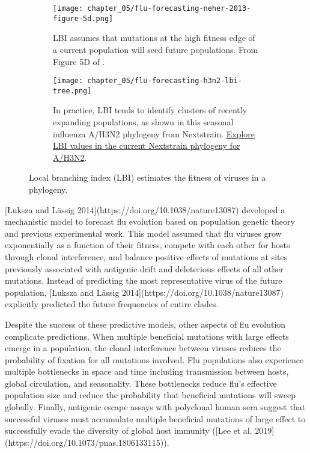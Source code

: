 \begin{figure}
  \centering
  \begin{subfigure}[b]{0.5\textwidth}
    \centering
    \texttt{[image: chapter\_05/flu-forecasting-neher-2013-figure-5d.png]}
    \caption{LBI assumes that mutations at the high fitness edge of a current population will seed future populations.
      From Figure 5D of \citet{Neher2013}.}
    \label{fig:lbi-theory}
  \end{subfigure}
  \hfill
  \begin{subfigure}[b]{0.5\textwidth}
    \centering
    \texttt{[image: chapter\_05/flu-forecasting-h3n2-lbi-tree.png]}
    \caption{In practice, LBI tends to identify clusters of recently expanding populations, as shown in this seasonal influenza A/H3N2 phylogeny from Nextstrain.
      \href{https://nextstrain.org/flu/seasonal/h3n2/ha/2y?c=lbi}{Explore LBI values in the current Nextstrain phylogeny for A/H3N2}.}
    \label{fig:lbi-practice}
  \end{subfigure}

  \caption{Local branching index (LBI) estimates the fitness of viruses in a phylogeny.}
  \label{fig:lbi}
\end{figure}

[Łuksza and Lässig 2014](https://doi.org/10.1038/nature13087) developed a mechanistic model to forecast flu evolution based on population genetic theory and previous experimental work.
This model assumed that flu viruses grow exponentially as a function of their fitness, compete with each other for hosts through clonal interference, and balance positive effects of mutations at sites previously associated with antigenic drift and deleterious effects of all other mutations.
Instead of predicting the most representative virus of the future population, [Łuksza and Lässig 2014](https://doi.org/10.1038/nature13087) explicitly predicted the future frequencies of entire clades.

Despite the success of these predictive models, other aspects of flu evolution complicate predictions.
When multiple beneficial mutations with large effects emerge in a population, the clonal interference between viruses reduces the probability of fixation for all mutations involved.
Flu populations also experience multiple bottlenecks in space and time including transmission between hosts, global circulation, and seasonality.
These bottlenecks reduce flu's effective population size and reduce the probability that beneficial mutations will sweep globally.
Finally, antigenic escape assays with polyclonal human sera suggest that successful viruses must accumulate multiple beneficial mutations of large effect to successfully evade the diversity of global host immunity ([Lee et al. 2019](https://doi.org/10.1073/pnas.1806133115)).

